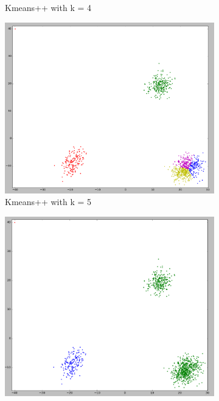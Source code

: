 \begin{figure}
\begin{subfigure}{.33\textwidth}
    \caption{Kmeans++ with k = 4}
    \label{1-trilinear-compositing}
  \end{subfigure}
  \begin{subfigure}{.33\textwidth}
    \centering
    \includegraphics[width=\textwidth]{shots/clusters-kmeanspp-5}
    \caption{Kmeans++ with k = 5}
    \label{1-trilinear-compositing}
  \end{subfigure}
  \begin{subfigure}{.33\textwidth}
    \centering
    \includegraphics[width=\textwidth]{shots/clusters-gonz-3}

\end{subfigure}
\end{figure}
